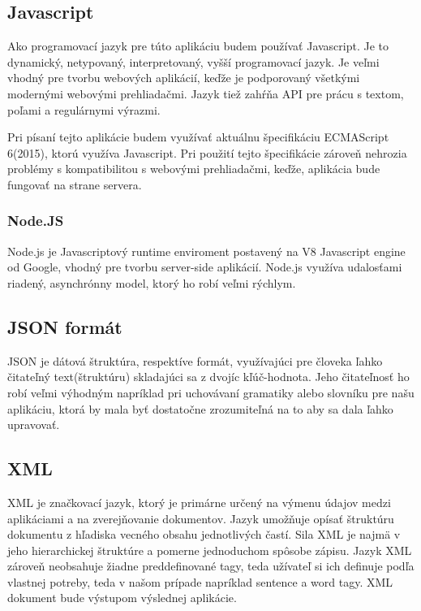 \documentclass[12pt,a4paper]{report}
\theoremstyle{definition}
\theoremstyle{remark}
\begin{document}
\subsection{Javascript}
Ako programovací jazyk pre túto aplikáciu budem používať Javascript. Je to dynamický, netypovaný, interpretovaný, vyšší programovací jazyk. Je veľmi vhodný pre tvorbu webových aplikácií, keďže je podporovaný všetkými modernými webovými prehliadačmi. Jazyk tiež zahŕňa API pre prácu s textom, poľami a regulárnymi výrazmi.

Pri písaní tejto aplikácie budem využívať aktuálnu špecifikáciu ECMAScript 6(2015), ktorú využíva Javascript. Pri použití tejto špecifikácie zároveň nehrozia problémy s kompatibilitou s webovými prehliadačmi, keďže, aplikácia bude fungovať na strane servera.\cite{js}

\subsubsection{Node.JS}
Node.js je Javascriptový runtime enviroment postavený na V8 Javascript engine od Google, vhodný pre tvorbu server-side aplikácií. Node.js využíva udalosťami riadený, asynchrónny model, ktorý ho robí veľmi rýchlym.


\subsection{JSON formát}
JSON je dátová štruktúra, respektíve formát, využívajúci pre človeka ľahko čitateľný text(štruktúru) skladajúci sa z dvojíc kľúč-hodnota. Jeho čitateľnosť ho robí veľmi výhodným napríklad pri uchovávaní gramatiky alebo slovníku pre našu aplikáciu, ktorá by mala byť dostatočne zrozumiteľná na to aby sa dala ľahko upravovať.


\subsection{XML}
XML je značkovací jazyk, ktorý je primárne určený na výmenu údajov medzi aplikáciami a na zverejňovanie dokumentov. Jazyk umožňuje opísať štruktúru dokumentu z hľadiska vecného obsahu jednotlivých častí. Sila XML je najmä v jeho hierarchickej štruktúre a pomerne jednoduchom spôsobe zápisu. Jazyk XML zároveň neobsahuje žiadne preddefinované tagy, teda užívateľ si ich definuje podľa vlastnej potreby, teda v našom prípade napríklad sentence a word tagy. XML dokument bude výstupom výslednej aplikácie.

\end{document}
